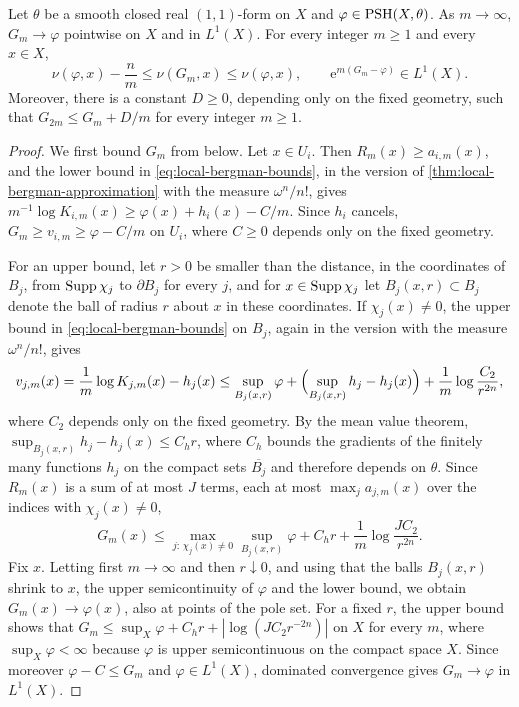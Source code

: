 
\begin{lemma}\label{lem:global-bergman-limit-and-doubling}
Let $\theta$ be a smooth closed real $(1,1)$-form on $X$ and $\varphi\in\mathrm{PSH}(X,\theta)$. As $m\to\infty$, $G_m\to\varphi$ pointwise on $X$ and in $L^1(X)$. For every integer $m\geq1$ and every $x\in X$,
\[
 \nu(\varphi,x)-\frac nm\leq\nu(G_m,x)\leq\nu(\varphi,x),
 \qquad \mathrm e^{m(G_m-\varphi)}\in L^1(X).
\]
Moreover, there is a constant $D\geq0$, depending only on the fixed geometry, such that $G_{2m}\leq G_m+D/m$ for every integer $m\geq1$.
\end{lemma}
\begin{proof}
We first bound $G_m$ from below. Let $x\in U_i$. Then $R_m(x)\geq a_{i,m}(x)$, and the lower bound in \eqref{eq:local-bergman-bounds}, in the version of \cref{thm:local-bergman-approximation} with the measure $\omega^n/n!$, gives $m^{-1}\log K_{i,m}(x)\geq\varphi(x)+h_i(x)-C/m$. Since $h_i$ cancels, $G_m\geq v_{i,m}\geq\varphi-C/m$ on $U_i$, where $C\geq0$ depends only on the fixed geometry.

For an upper bound, let $r>0$ be smaller than the distance, in the coordinates of $B_j$, from $\operatorname{Supp}\chi_j$ to $\partial B_j$ for every $j$, and for $x\in\operatorname{Supp}\chi_j$ let $B_j(x,r)\subset B_j$ denote the ball of radius $r$ about $x$ in these coordinates. If $\chi_j(x)\neq0$, the upper bound in \eqref{eq:local-bergman-bounds} on $B_j$, again in the version with the measure $\omega^n/n!$, gives
\[
 v_{j,m}(x)=\frac1m\log K_{j,m}(x)-h_j(x)\leq\sup_{B_j(x,r)}\varphi+\Bigl(\sup_{B_j(x,r)}h_j-h_j(x)\Bigr)+\frac1m\log\frac{C_2}{r^{2n}},
\]
where $C_2$ depends only on the fixed geometry. By the mean value theorem, $\sup_{B_j(x,r)}h_j-h_j(x)\leq C_hr$, where $C_h$ bounds the gradients of the finitely many functions $h_j$ on the compact sets $\overline{B_j}$ and therefore depends on $\theta$. Since $R_m(x)$ is a sum of at most $J$ terms, each at most $\max_ja_{j,m}(x)$ over the indices with $\chi_j(x)\neq0$,
\[
 G_m(x)\leq\max_{j:\,\chi_j(x)\neq0}\sup_{B_j(x,r)}\varphi+C_hr+\frac1m\log\frac{JC_2}{r^{2n}}.
\]
Fix $x$. Letting first $m\to\infty$ and then $r\downarrow0$, and using that the balls $B_j(x,r)$ shrink to $x$, the upper semicontinuity of $\varphi$ and the lower bound, we obtain $G_m(x)\to\varphi(x)$, also at points of the pole set. For a fixed $r$, the upper bound shows that $G_m\leq\sup_X\varphi+C_hr+|\log(JC_2r^{-2n})|$ on $X$ for every $m$, where $\sup_X\varphi<\infty$ because $\varphi$ is upper semicontinuous on the compact space $X$. Since moreover $\varphi-C\leq G_m$ and $\varphi\in L^1(X)$, dominated convergence gives $G_m\to\varphi$ in $L^1(X)$.


\end{proof}
